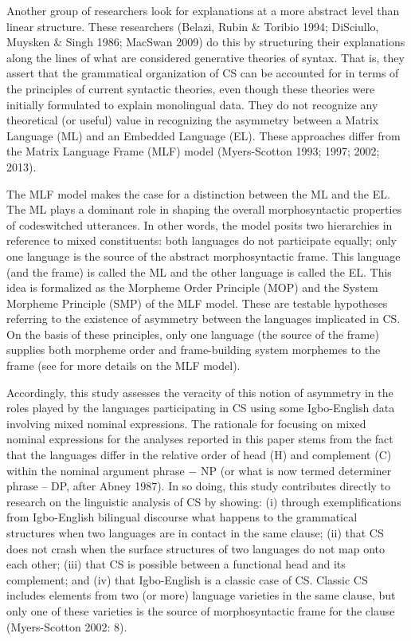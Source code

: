 \documentclass[output=paper]{langsci/langscibook}
\begin{document}
Another group of researchers look for explanations at a more abstract level than linear structure. These researchers (Belazi, Rubin \& Toribio 1994; DiSciullo, Muysken \& Singh 1986; MacSwan 2009) do this by structuring their explanations along the lines of what are considered generative theories of syntax. That is, they assert that the grammatical organization of CS can be accounted for in terms of the principles of current syntactic theories, even though these theories were initially formulated to explain monolingual data. They do not recognize any theoretical (or useful) value in recognizing the asymmetry between a Matrix Language (ML) and an Embedded Language (EL). These approaches differ from the Matrix Language Frame (MLF) model (Myers-Scotton 1993; 1997; 2002; 2013).

The MLF model makes the case for a distinction between the ML and the EL. The ML plays a dominant role in shaping the overall morphosyntactic properties of codeswitched utterances. In other words, the model posits two hierarchies in reference to mixed constituents: both languages do not participate equally; only one language is the source of the abstract morphosyntactic frame. This language (and the frame) is called the ML and the other language is called the EL. This idea is formalized as the Morpheme Order Principle (MOP) and the System Morpheme Principle (SMP) of the MLF model. These are testable hypotheses referring to the existence of asymmetry between the languages implicated in CS. On the basis of these principles, only one language (the source of the frame) supplies both morpheme order and frame-building system morphemes to the frame (see  for more details on the MLF model). 

Accordingly, this study assesses the veracity of this notion of asymmetry in the roles played by the languages participating in CS using some Igbo-English data involving mixed nominal expressions. The rationale for focusing on mixed nominal expressions for the analyses reported in this paper stems from the fact that the languages differ in the relative order of head (H) and complement (C) within the nominal argument phrase $-$ NP (or what is now termed determiner phrase – DP, after Abney 1987). In so doing, this study contributes directly to research on the linguistic analysis of CS by showing: (i) through exemplifications from Igbo-English bilingual discourse what happens to the grammatical structures when two languages are in contact in the same clause; (ii) that CS does not crash when the surface structures of two languages do not map onto each other; (iii) that CS is possible between a functional head and its complement; and (iv) that Igbo-English is a classic case of CS. Classic CS includes elements from two (or more) language varieties in the same clause, but only one of these varieties is the source of morphosyntactic frame for the clause (Myers-Scotton 2002: 8).
\end{document}
